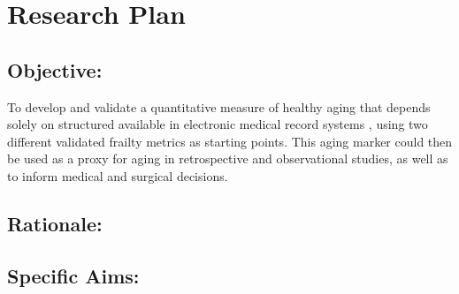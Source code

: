 \section{Research Plan }\label{research-plan}


\subsection{Objective:}\label{objective}
  
To develop and validate a quantitative measure of healthy aging that depends solely on structured available in electronic medical record systems ,
using two different validated frailty metrics as starting points. This
aging marker could then be used as a proxy for aging in retrospective
and observational studies, as well as to inform medical and surgical
decisions.


\subsection{Rationale:}\label{rationale}

\subsection{Specific Aims:}\label{specific-aims}
